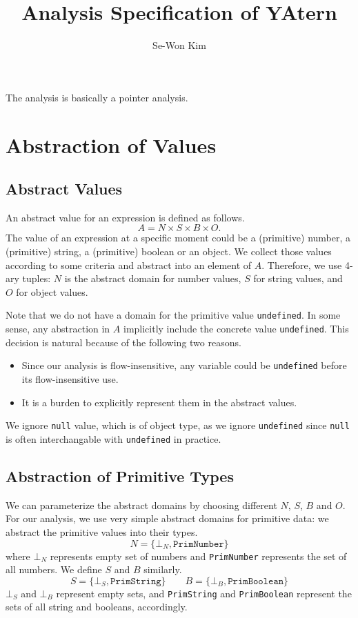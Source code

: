 \documentclass{report}
\begin{document}
\title{Analysis Specification of YAtern}
\author{Se-Won Kim}
\maketitle

The analysis is basically a pointer analysis.

\chapter{Abstraction of Values}
\section{Abstract Values}
An abstract value for an expression is defined as follows.
\[
A = N \times S \times B \times O.
\]
The value of an expression at a specific moment could be a (primitive) number, 
a (primitive) string, a (primitive) boolean or an object.
We collect those values according to some criteria 
and abstract into an element of $A$.
Therefore, we use 4-ary tuples:
$N$ is the abstract domain for number values, 
$S$ for string values, and $O$ for object values. 

Note that we do not have a domain for the primitive 
value \texttt{undefined}. 
In some sense, any abstraction in $A$ implicitly include 
the concrete value \texttt{undefined}.
This decision is natural because of the following two reasons.
\begin{itemize}
\item Since our analysis is flow-insensitive,
  any variable could be \texttt{undefined} before its flow-insensitive use.
\item It is a burden to explicitly represent them in the abstract values.
\end{itemize}
We ignore \texttt{null} value, which is of object type,
as we ignore \texttt{undefined} 
since \texttt{null} is often interchangable 
with \texttt{undefined} in practice.

\section{Abstraction of Primitive Types}
We can parameterize the abstract domains by choosing 
different $N$, $S$, $B$ and $O$. 
For our analysis, we use very simple abstract domains for primitive data: 
we abstract the primitive values into their types.
\[
N = \{ \bot_N, \texttt{PrimNumber} \}
\]
where $\bot_N$ represents empty set of numbers and 
\texttt{PrimNumber} represents the set of all numbers. 
We define $S$ and $B$ similarly.
\[
S = \{ \bot_S, \texttt{PrimString} \}
\qquad
B = \{ \bot_B, \texttt{PrimBoolean} \}
\]
$\bot_S$ and $\bot_B$ represent empty sets, and \texttt{PrimString} and 
\texttt{PrimBoolean} represent the sets of all string and booleans, 
accordingly.
\end{document}
